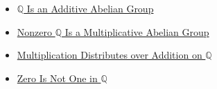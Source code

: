 \begin{dependencies}
\begin{itemize}
  \item \hyperref[thm:q-additive-abelian-group]{$\mathbb{Q}$ Is an Additive Abelian Group}
  \item \hyperref[thm:q-nonzero-multiplicative-abelian-group]{Nonzero $\mathbb{Q}$ Is a Multiplicative Abelian Group}
  \item \hyperref[thm:multiplication-distributes-over-addition-on-q]{Multiplication Distributes over Addition on $\mathbb{Q}$}
  \item \hyperref[thm:zero-not-one-in-q]{Zero Is Not One in $\mathbb{Q}$}
\end{itemize}
\end{dependencies}
